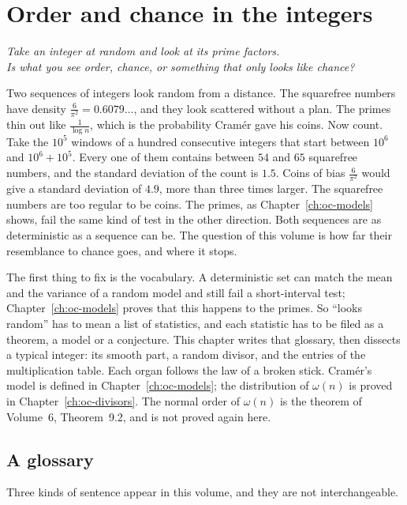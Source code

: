 \chapter{Order and chance in the integers}\label{ch:oc-integers}\label{ch:anatomy}

\begin{center}\itshape
Take an integer at random and look at its prime factors.\\
Is what you see order, chance, or something that only looks like chance?
\end{center}

Two sequences of integers look random from a distance. The squarefree numbers have density $\frac6{\pi^2}=0.6079\ldots$, and they look scattered without a plan. The primes thin out like $\frac1{\log n}$, which is the probability Cram\'er gave his coins. Now count. Take the $10^5$ windows of a hundred consecutive integers that start between $10^6$ and $10^6+10^5$. Every one of them contains between $54$ and $65$ squarefree numbers, and the standard deviation of the count is $1.5$. Coins of bias $\frac6{\pi^2}$ would give a standard deviation of $4.9$, more than three times larger. The squarefree numbers are too regular to be coins. The primes, as Chapter~\ref{ch:oc-models} shows, fail the same kind of test in the other direction. Both sequences are as deterministic as a sequence can be. The question of this volume is how far their resemblance to chance goes, and where it stops.

The first thing to fix is the vocabulary. A deterministic set can match the mean and the variance of a random model and still fail a short-interval test; Chapter~\ref{ch:oc-models} proves that this happens to the primes. So ``looks random'' has to mean a list of statistics, and each statistic has to be filed as a theorem, a model or a conjecture. This chapter writes that glossary, then dissects a typical integer: its smooth part, a random divisor, and the entries of the multiplication table. Each organ follows the law of a broken stick. Cram\'er's model is defined in Chapter~\ref{ch:oc-models}; the distribution of $\omega(n)$ is proved in Chapter~\ref{ch:oc-divisors}. The normal order of $\omega(n)$ is the theorem of Volume~6, Theorem~9.2, and is not proved again here.

\section{A glossary}

Three kinds of sentence appear in this volume, and they are not interchangeable.

